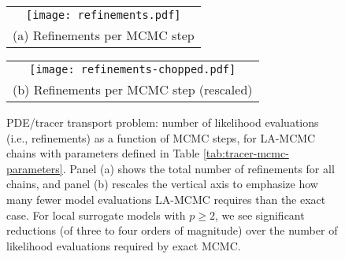 \begin{figure}
  \centering
  
  \begin{tabular}{@{}c@{}}
    \texttt{[image: refinements.pdf]} \\[\abovecaptionskip]
    \small (a) Refinements per MCMC step 
  \end{tabular}
  
  \begin{tabular}{@{}c@{}}
    \texttt{[image: refinements-chopped.pdf]} \\[\abovecaptionskip]
    \small (b) Refinements per MCMC step (rescaled)
  \end{tabular}
  
  \caption{PDE/tracer transport problem: number of likelihood evaluations (i.e., refinements) as a function of MCMC steps, for LA-MCMC chains with parameters defined in Table \ref{tab:tracer-mcmc-parameters}. Panel (a) shows the total number of refinements for all chains, and panel (b) rescales the vertical axis to emphasize how many fewer model evaluations LA-MCMC requires than the exact case. For local surrogate models with $p \geq 2$, we see significant reductions (of three to four orders of magnitude) over the number of likelihood evaluations required by exact MCMC.}
  \label{fig:tracer-refinements}
\end{figure}

